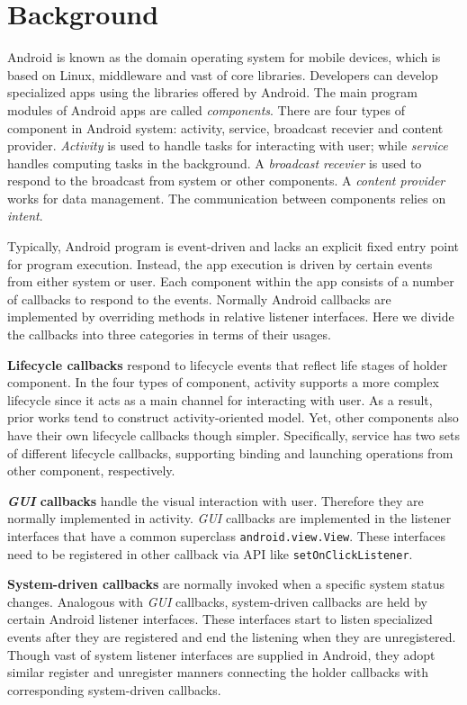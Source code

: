 \section{Background} \label{background}
Android is known as the domain operating system for mobile devices, which is based on Linux, middleware and vast of core libraries. Developers can develop specialized apps using the libraries offered by Android. The main program modules of Android apps are called \textit{components}. There are four types of component in Android system: activity, service, broadcast recevier and content provider. \textit{Activity} is used to handle tasks for interacting with user; while \textit{service} handles computing tasks in the background. A \textit{broadcast recevier} is used to respond to the broadcast from system or other components. A \textit{content provider} works for data management. The communication between components relies on \textit{intent}.

Typically, Android program is event-driven and lacks an explicit fixed entry point for program execution.  
Instead, the app execution is driven by certain events from either system or user. Each component within the app consists of a number of callbacks to respond to the events. Normally Android callbacks are implemented by overriding methods in relative listener interfaces. Here we divide the callbacks into three categories in terms of their usages.
 
\textbf{Lifecycle callbacks} respond to lifecycle events that reflect life stages of holder component. In the four types of component, activity supports a more complex lifecycle since it acts as a main channel for interacting with user. As a result, prior works tend to construct activity-oriented model. Yet, other components also have their own lifecycle callbacks though simpler. Specifically, service has two sets of different lifecycle callbacks, supporting binding and launching operations from other component, respectively. 

\textbf{\textit{GUI} callbacks} handle the visual interaction with user. Therefore they are normally implemented in activity. \textit{GUI} callbacks are implemented in the listener interfaces that have a common superclass \texttt{android.view.View}. These interfaces need to be registered in other callback via API like \texttt{setOnClickListener}.

\textbf{System-driven callbacks} are normally invoked when a specific system status changes. Analogous with \textit{GUI} callbacks, system-driven callbacks are held by certain Android listener interfaces. These interfaces start to listen specialized events after they are registered and end the listening when they are unregistered. Though vast of system listener interfaces are supplied in Android, they adopt similar register and unregister manners connecting the holder callbacks with corresponding system-driven callbacks. 

